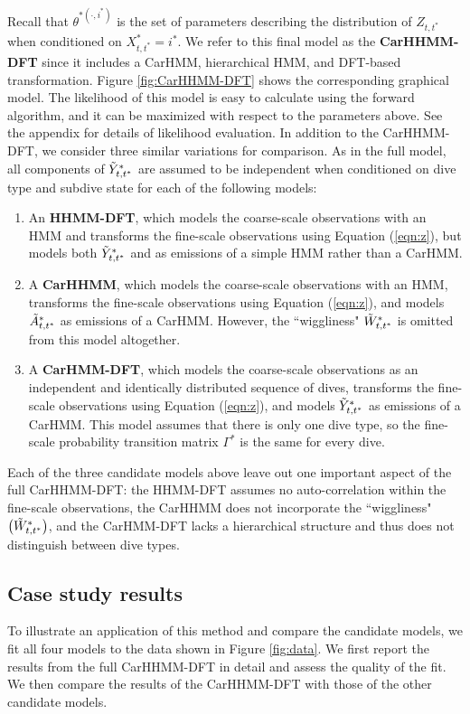 %
Recall that $\theta^{*(\cdot,i^*)}$ is the set of parameters describing the distribution of $Z_{t,t^*}$ when conditioned on $X^*_{t,t^*} = i^*$. 
%
We refer to this final model as the \textbf{CarHHMM-DFT} since it includes a CarHMM, hierarchical HMM, and DFT-based transformation. Figure \ref{fig:CarHHMM-DFT} shows the corresponding graphical model. The likelihood of this model is easy to calculate using the forward algorithm, and it can be maximized with respect to the parameters above. See the appendix for details of likelihood evaluation. In addition to the CarHHMM-DFT, we consider three similar variations for comparison. As in the full model, all components of $\tilde{Y}^*_{t,t^*}$ are assumed to be independent when conditioned on dive type and subdive state for each of the following models:
\begin{enumerate}
    \item An \textbf{HHMM-DFT}, which models the coarse-scale observations with an HMM and transforms the fine-scale observations using Equation (\ref{eqn:z}), but models both $\tilde{Y}^*_{t,t^*}$ and as emissions of a simple HMM rather than a CarHMM.
    \item A \textbf{CarHHMM}, which models the coarse-scale observations with an HMM, transforms the fine-scale observations using Equation (\ref{eqn:z}), and models $\tilde{A}^*_{t,t^*}$ as emissions of a CarHMM. However, the ``wiggliness"  $\tilde{W}^*_{t,t^*}$ is omitted from this model altogether.
    \item A \textbf{CarHMM-DFT}, which models the coarse-scale observations as an independent and identically distributed sequence of dives, transforms the fine-scale observations using Equation (\ref{eqn:z}), and models $\tilde{Y}^*_{t,t^*}$ as emissions of a CarHMM. This model assumes that there is only one dive type, so the fine-scale probability transition matrix $\Gamma^*$ is the same for every dive. 
\end{enumerate}
%
Each of the three candidate models above leave out one important aspect of the full CarHHMM-DFT: the HHMM-DFT assumes no auto-correlation within the fine-scale observations, the CarHHMM does not incorporate the ``wiggliness" $\big(\tilde{W}^*_{t,t^*}\big)$, and the CarHMM-DFT lacks a hierarchical structure and thus does not distinguish between dive types.

\subsection{Case study results}

To illustrate an application of this method and compare the candidate models, we fit all four models to the data shown in Figure \ref{fig:data}. We first report the results from the full CarHHMM-DFT in detail and assess the quality of the fit. We then compare the results of the CarHHMM-DFT with those of the other candidate models.

